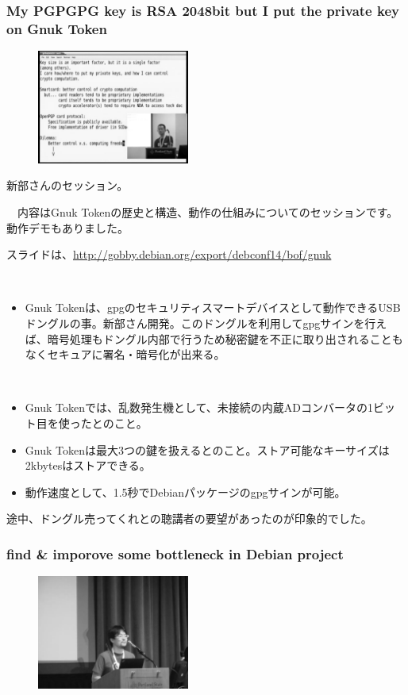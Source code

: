 \documentclass[mingoth,a4paper]{jsarticle}
\begin{document}
\subsubsection{My PGPGPG key is RSA 2048bit but I put the private key on Gnuk Token}

\begin{figure}
  \includegraphics[width=5cm]{image201409/gnuk_mono.png}
\end{figure}

 新部さんのセッション。

　内容はGnuk Tokenの歴史と構造、動作の仕組みについてのセッションです。動作デモもありました。

 スライドは、\url{http://gobby.debian.org/export/debconf14/bof/gnuk}

　\begin{itemize}
  \item Gnuk Tokenは、gpgのセキュリティスマートデバイスとして動作できるUSBドングルの事。新部さん開発。このドングルを利用してgpgサインを行えば、暗号処理もドングル内部で行うため秘密鍵を不正に取り出されることもなくセキュアに署名・暗号化が出来る。　　　　
　\end{itemize}

　\begin{itemize}
  \item Gnuk Tokenでは、乱数発生機として、未接続の内蔵ADコンバータの1ビット目を使ったとのこと。
  \item Gnuk Tokenは最大3つの鍵を扱えるとのこと。ストア可能なキーサイズは2kbytesはストアできる。
　\item 動作速度として、1.5秒でDebianパッケージのgpgサインが可能。
  \end{itemize}

 途中、ドングル売ってくれとの聴講者の要望があったのが印象的でした。

\subsubsection{find \& imporove some bottleneck in Debian project}

\begin{figure}
  \includegraphics[width=5cm]{image201409/find_improve_mono.png}
\end{figure}
\end{document}
